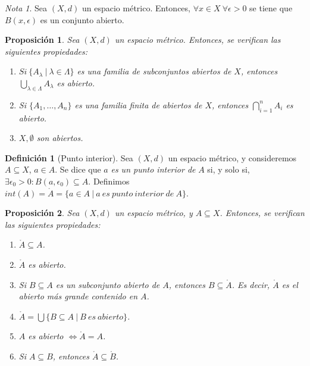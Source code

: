 \documentclass[11pt,a4paper, titlepage]{article}
\theoremstyle{plain}
\newtheorem*{nprop}{Proposición}
\theoremstyle{remark}
\newtheorem*{nota}{Nota}
\theoremstyle{definition}
\newtheorem*{ndef}{Definición}
\newenvironment{nlist}
  {\begin{enumerate}\renewcommand\labelenumi{(\emph{\roman{enumi})}}}
  {\end{enumerate}}
\begin{document}
\begin{nota}
Sea $(X,d)$ un espacio métrico. Entonces, $\forall x \in X \ \forall \epsilon > 0$ se tiene que $B(x,\epsilon)$ es un conjunto abierto.
\end{nota}



\begin{nprop}
Sea $(X,d)$ un espacio métrico. Entonces, se verifican las siguientes propiedades:

\begin{nlist}
\item $Si\ \{A_\lambda \ | \ \lambda \in \Lambda \}$ es una familia de subconjuntos abiertos de $X$, entonces $\displaystyle \bigcup_{\lambda \in \Lambda} A_\lambda$ es abierto.

\item Si $\{A_1,\dots, A_n\}$ es una familia finita de abiertos de $X$, entonces $\displaystyle \bigcap_{i=1}^n A_i$ es abierto.

\item $X,\emptyset$ son abiertos.
\end{nlist}
\end{nprop}



\begin{ndef}[Punto interior]
Sea $(X,d)$ un espacio métrico, y consideremos $A\subseteq X$, $a\in A$. Se dice que $a$ \emph{es un punto interior de} $A$ si, y solo si, $\exists \epsilon_0 > 0: B(a,\epsilon_0)\subseteq A$.  Definimos $int(A) = \mathring{A} = \{ a\in A \ | \ a\ es\ punto\ interior\ de\ A\}$.
\end{ndef}



\begin{nprop}
Sea $(X,d)$ un espacio métrico, y $A\subseteq X$. Entonces, se verifican las siguientes propiedades:

\begin{nlist}
\item $\mathring{A} \subseteq A$.

\item $\mathring{A}$ es abierto.

\item Si $B\subseteq A$ es un subconjunto abierto de $A$, entonces $B \subseteq \mathring{A}$. Es decir, $\mathring{A}$ es el abierto más grande contenido en $A$.

\item $\displaystyle \mathring{A}  = \bigcup \{ B\subseteq A \ | \ B\ es\ abierto \}$.

\item $A$ es abierto $\iff \mathring{A} =A$.

\item Si $A\subseteq B$, entonces $\mathring{A} \subseteq \mathring{B}$.
\end{nlist}
\end{nprop}
\end{document}
